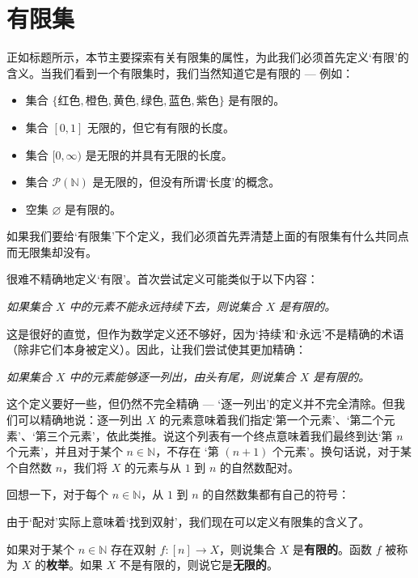 \section{有限集}

正如标题所示，本节主要探索有关有限集的属性，为此我们必须首先定义`有限'的含义。当我们看到一个有限集时，我们当然知道它是有限的 --- 例如：
\begin{itemize}
\item 集合 $\{ \text{红色}, \text{橙色}, \text{黄色}, \text{绿色}, \text{蓝色}, \text{紫色} \}$ 是有限的。
\item 集合 $[0,1]$ 无限的，但它有有限的长度。
\item 集合 $[0,\infty)$ 是无限的并具有无限的长度。
\item 集合 $\mathcal{P}(\mathbb{N})$ 是无限的，但没有所谓`长度'的概念。
\item 空集 $\varnothing$ 是有限的。
\end{itemize}

如果我们要给`有限集'下个定义，我们必须首先弄清楚上面的有限集有什么共同点而无限集却没有。

很难不精确地定义`有限'。首次尝试定义可能类似于以下内容：
\begin{center}
\textit{如果集合 $X$ 中的元素不能永远持续下去，则说集合 $X$ 是有限的。}
\end{center}
这是很好的直觉，但作为数学定义还不够好，因为`持续'和`永远'不是精确的术语（除非它们本身被定义）。因此，让我们尝试使其更加精确：
\begin{center}
\textit{如果集合 $X$ 中的元素能够逐一列出，由头有尾，则说集合 $X$ 是有限的。}
\end{center}
这个定义要好一些，但仍然不完全精确 --- `逐一列出'的定义并不完全清除。但我们可以精确地说：逐一列出 $X$ 的元素意味着我们指定`第一个元素'、`第二个元素'、`第三个元素'，依此类推。说这个列表有一个终点意味着我们最终到达`第 $n$ 个元素'，并且对于某个 $n \in \mathbb{N}$，不存在 `第 $(n +1) $ 个元素'。换句话说，对于某个自然数 $n$，我们将 $X$ 的元素与从 $1$ 到 $n$ 的自然数配对。

回想一下，对于每个 $n \in \mathbb{N}$，从 $1$ 到 $n$ 的自然数集都有自己的符号：

\RSdefBracketN*

由于`配对'实际上意味着`找到双射'，我们现在可以定义有限集的含义了。

\begin{definition}
\label{defFiniteSet}
如果对于某个 $n \in \mathbb{N}$ 存在双射 $f : [n] \to X$，则说集合 $X$ 是\textbf{有限的}。函数 $f$ 被称为 $X$ 的\textbf{枚举}。如果 $X$ 不是有限的，则说它是\textbf{无限的}。
\end{definition}

